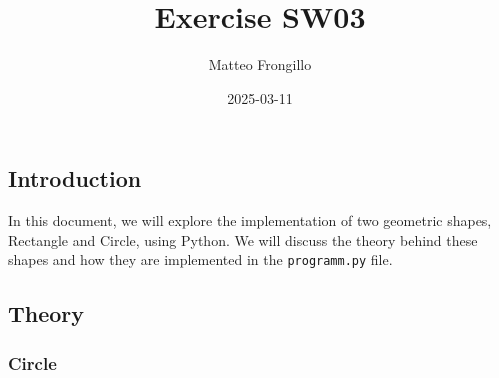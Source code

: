 \documentclass[
]{article}
\title{Exercise SW03}
\author{Matteo Frongillo}
\date{2025-03-11}
\begin{document}
\maketitle


\subsection{Introduction}\label{introduction}

In this document, we will explore the implementation of two geometric
shapes, Rectangle and Circle, using Python. We will discuss the theory
behind these shapes and how they are implemented in the
\texttt{programm.py} file.

\subsection{Theory}\label{theory}

\subsubsection{Circle}\label{circle}
\end{document}
